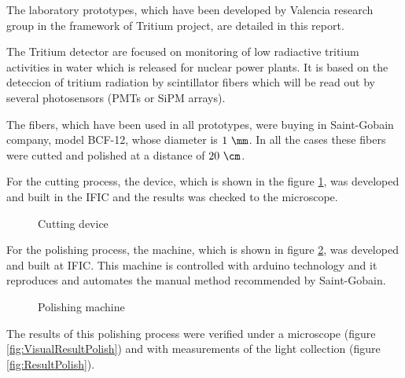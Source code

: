 The laboratory prototypes, which have been developed by Valencia research group in the framework of Tritium project, are detailed in this report. 

The Tritium detector are focused on monitoring of low radiactive tritium activities in water which is released for nuclear power plants. It is based on the deteccion of tritium radiation by scintillator fibers which will be read out by several photosensors (PMTs or SiPM arrays).

The fibers, which have been used in all prototypes, were buying in Saint-Gobain company, model BCF-12, whose diameter is $1~\mm$. In all the cases these fibers were cutted and polished at a distance of $20~\cm$. 

For the cutting process, the device, which is shown in the figure \ref{fig:Cuttingdevice}, was developed and built in the IFIC and the results was checked to the microscope.

\begin{figure}[htb]
\centering
{
}
\caption{Cutting device \label{fig:Cuttingdevice}}
\end{figure} 

For the polishing process, the machine, which is shown in figure \ref{fig:PolishingMachine}, was developed and built at IFIC. This machine is controlled with arduino technology and it reproduces and automates the manual method recommended by Saint-Gobain. 

\begin{figure}[htb]
\centering
{
}
\caption{Polishing machine \label{fig:PolishingMachine}}
\end{figure} 

The results of this polishing process were verified under a microscope (figure \ref{fig:VisualResultPolish}) and with measurements of the light collection (figure \ref{fig:ResultPolish}). 

